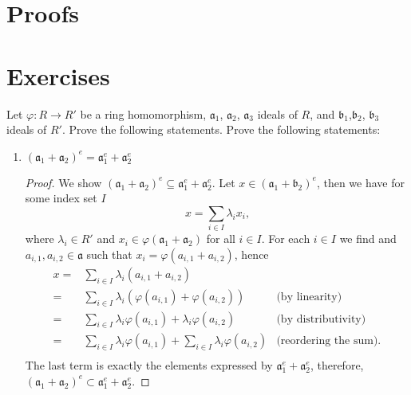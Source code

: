 \section{Proofs}

\section{Exercises}
\begin{exr}
    Let \(\varphi: R \longrightarrow R'\) be a ring homomorphism, \(\mathfrak{a}_1\), \(\mathfrak{a}_2\), \(\mathfrak{a}_3\) ideals of \(R\), and \(\mathfrak{b}_1\),\(\mathfrak{b}_2\), \(\mathfrak{b}_3\) ideals of \(R'\). Prove the following statements. Prove the following statements:
    \begin{enumerate}
        \item \((\mathfrak{a}_1 + \mathfrak{a}_2)^e = \mathfrak{a}_1^e + \mathfrak{a}_2^e\)
        \begin{proof}
            We show \((\mathfrak{a}_1 + \mathfrak{a}_2)^e \subseteq \mathfrak{a}_1^e + \mathfrak{a}_2^e\). Let \(x \in (\mathfrak{a}_1 + \mathfrak{b}_2)^e\), then we have for some index set \(I\)
            \begin{equation}
              x = \sum_{i \in I} \lambda_i x_i \text{,}
            \end{equation}
            where \(\lambda_i \in R'\) and \(x_i \in \varphi(\mathfrak{a}_1 + \mathfrak{a}_2)\) for all \(i \in I\). For each \(i \in I\) we find and \(a_{i, 1}, a_{i, 2} \in \mathfrak{a}\) such that \(x_i = \varphi(a_{i, 1} +  a_{i, 2})\), hence
            \begin{align}
              x =& \sum_{i \in I} \lambda_i (a_{i, 1} +  a_{i, 2}) &  \\
              =& \sum_{i \in I} \lambda_i \left( \varphi(a_{i, 1}) + \varphi(a_{i, 2}) \right)&\text{(by linearity)} \\
              =& \sum_{i \in I} \lambda_i \varphi( a_{i, 1}) + \lambda_i \varphi( a_{i, 2}) & \text{(by distributivity)} \\
              =& \sum_{i \in I} \lambda_i \varphi( a_{i, 1}) + \sum_{i \in I} \lambda_i  \varphi( a_{i, 2}) & \text{(reordering the sum)} \text{.} \\
            \end{align}
            The last term is exactly the elements expressed by \(\mathfrak{a}_1^e + \mathfrak{a}_2^e\), therefore, \((\mathfrak{a}_1 + \mathfrak{a}_2)^e \subset \mathfrak{a}_1^e + \mathfrak{a}_2^e\).
      

\end{proof}
\end{enumerate}
\end{exr}
